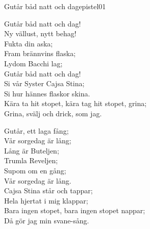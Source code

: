 \begin{song}{Gutår båd natt och dag}{epistel01}
\begin{vers}
Gutår båd natt och dag!\\
Ny vällust, nytt behag!\\
Fukta din aska;\\
Fram brännvins flaska;\\
Lydom Bacchi lag;\\
Gutår båd natt och dag!\\
Si vår Syster Cajsa Stina;\\
Si hur hännes flaskor skina.\\
Kära ta hit stopet, kära tag hit stopet, grina;\\
Grina, svälj och drick, som jag.\\
\end{vers}
\begin{vers}
Gutår, ett laga fång;\\
Vår sorgedag är lång;\\
Lång är Buteljen;\\
Trumla Reveljen;\\
Supom om en gång;\\
Vår sorgedag är lång.\\
Cajsa Stina står och tappar;\\
Hela hjertat i mig klappar;\\
Bara ingen stopet, bara ingen stopet nappar;\\
Då gör jag min svane-sång.\\
\end{vers}
\end{song}


\newpage

